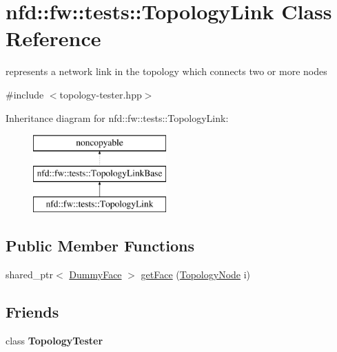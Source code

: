 \hypertarget{classnfd_1_1fw_1_1tests_1_1TopologyLink}{}\section{nfd\+:\+:fw\+:\+:tests\+:\+:Topology\+Link Class Reference}
\label{classnfd_1_1fw_1_1tests_1_1TopologyLink}


represents a network link in the topology which connects two or more nodes  




{\ttfamily \#include $<$topology-\/tester.\+hpp$>$}

Inheritance diagram for nfd\+:\+:fw\+:\+:tests\+:\+:Topology\+Link\+:\begin{figure}[H]
\begin{center}
\leavevmode
\includegraphics[height=3.000000cm]{classnfd_1_1fw_1_1tests_1_1TopologyLink}
\end{center}
\end{figure}
\subsection*{Public Member Functions}
\begin{DoxyCompactItemize}
\item 
shared\+\_\+ptr$<$ \hyperlink{classnfd_1_1tests_1_1DummyFaceImpl}{Dummy\+Face} $>$ \hyperlink{classnfd_1_1fw_1_1tests_1_1TopologyLink_a2f34b625d2cbf33fcfe9fe999ffa4f57}{get\+Face} (\hyperlink{topology-tester_8hpp_a65eed57bba998574cb3a2e62126f33e8}{Topology\+Node} i)
\end{DoxyCompactItemize}
\subsection*{Friends}
\begin{DoxyCompactItemize}
\item 
class {\bfseries Topology\+Tester}\hypertarget{classnfd_1_1fw_1_1tests_1_1TopologyLink_ad2957f68ed7b1bdd9221b01579c80d94}{}\label{classnfd_1_1fw_1_1tests_1_1TopologyLink_ad2957f68ed7b1bdd9221b01579c80d94}

\end{DoxyCompactItemize}
